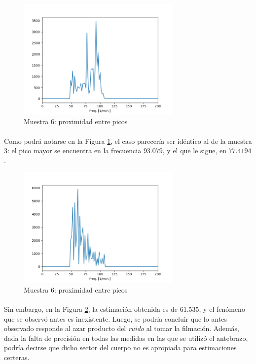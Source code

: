\documentclass[12pt, twocolumn]{article}
\begin{document}
	\begin{figure}[H]
		\centering
		\includegraphics[width=8cm]{sample6-c200_200_5.png}
		\caption{Muestra 6: proximidad entre picos}
		\label{6prox}
	\end{figure}
	
	\paragraph{} Como podrá notarse en la Figura \ref{6prox}, el caso parecería ser idéntico al de la muestra 3: el pico mayor se encuentra en la frecuencia $93.079$, y el que le sigue, en $77.4194$.
	
	\begin{figure}[H]
		\centering
		\includegraphics[width=8cm]{sample7-c200_200_5.png}
		\caption{Muestra 6: proximidad entre picos}
		\label{7nprox}
	\end{figure}
	
	\paragraph{} Sin embargo, en la Figura \ref{7nprox}, la estimación obtenida es de $61.535$, y el fenómeno que se observó antes es inexistente. Luego, se podría concluir que lo antes observado responde al azar producto del \textit{ruido} al tomar la filmación. Además, dada la falta de precisión en todas las medidas en las que se utilizó el antebrazo, podría decirse que dicho sector del cuerpo no es apropiada para estimaciones certeras.
	
\end{document}
